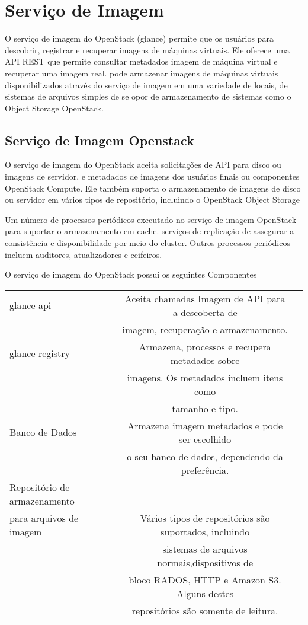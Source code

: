 \chapter{Serviço de Imagem}
O serviço de imagem do OpenStack (glance) permite que os usuários para descobrir, registrar e recuperar imagens de máquinas virtuais. Ele oferece uma API REST que permite consultar metadados imagem de máquina virtual e recuperar uma imagem real. pode armazenar imagens de máquinas virtuais disponibilizados através do serviço de imagem em uma variedade de locais, de sistemas de arquivos simples de se opor de armazenamento de sistemas como o Object Storage OpenStack.

\section{Serviço de Imagem Openstack}

O serviço de imagem do OpenStack aceita solicitações de API para disco ou imagens de servidor, e metadados de imagens dos usuários finais ou componentes OpenStack Compute. Ele também suporta o armazenamento de imagens de disco ou servidor em vários tipos de repositório, incluindo o OpenStack Object Storage

Um número de processos periódicos executado no serviço de imagem OpenStack para suportar o armazenamento em cache. serviços de replicação de assegurar a consistência e disponibilidade por meio do cluster. Outros processos periódicos incluem auditores, atualizadores e ceifeiros.

O serviço de imagem do OpenStack possui os seguintes Componentes \\
\begin{tabular}{|l||c|c}
\hline
	glance-api& Aceita chamadas Imagem de API para a descoberta de\\& imagem, recuperação e armazenamento. \\

\hline \hline
glance-registry& Armazena, processos e recupera metadados sobre\\& imagens. Os metadados incluem itens como\\& tamanho e tipo. \\

\hline \hline
Banco de Dados& Armazena imagem metadados e pode ser escolhido\\& o seu banco de dados, dependendo da preferência. \\

\hline \hline
Repositório de armazenamento \\para arquivos de imagem& Vários tipos de repositórios são suportados, incluindo\\& sistemas de arquivos normais,dispositivos de\\& bloco RADOS,
HTTP e Amazon S3. Alguns destes\\& repositórios são somente de leitura.
\end{tabular}

